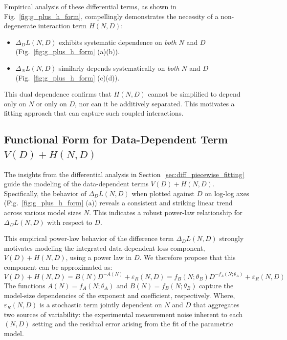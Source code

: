 \documentclass{article}
\begin{document}
Empirical analysis of these differential terms, as shown in Fig.~\ref{fig:g_plus_h_form}, compellingly demonstrates the necessity of a non-degenerate interaction term $H(N,D)$:
\begin{itemize}
    \item $\Delta_D L(N,D)$ exhibits systematic dependence on \emph{both} $N$ and $D$ (Fig.~\ref{fig:g_plus_h_form} (a)(b)).
    \item $\Delta_N L(N,D)$ similarly depends systematically on \emph{both} $N$ and $D$ (Fig.~\ref{fig:g_plus_h_form} (c)(d)).
\end{itemize}
This dual dependence confirms that $H(N,D)$ cannot be simplified to depend only on $N$ or only on $D$, nor can it be additively separated. This motivates a fitting approach that can capture such coupled interactions.

\subsection{Functional Form for Data-Dependent Term $V(D) + H(N, D)$} \label{sec:g_plus_h_form}
The insights from the differential analysis in Section~\ref{sec:diff_piecewise_fitting} guide the modeling of the data-dependent terms $V(D) + H(N,D)$. Specifically, the behavior of $\Delta_D L(N,D)$ when plotted against $D$ on log-log axes (Fig.~\ref{fig:g_plus_h_form} (a)) reveals a consistent and striking linear trend across various model sizes $N$. This indicates a robust power-law relationship for $\Delta_D L(N,D)$ with respect to $D$.

This empirical power-law behavior of the difference term $\Delta_D L(N,D)$ strongly motivates modeling the integrated data-dependent loss component, $V(D) + H(N,D)$, using a power law in $D$. We therefore propose that this component can be approximated as:
\begin{equation} \label{eq:g_plus_h_power_law_form}
    V(D) + H(N,D) = B(N) D^{-A(N)} + \varepsilon_R(N,D) = f_B(N;\theta_B) D^{-f_A(N;\theta_A)} + \varepsilon_R(N,D)
\end{equation}
The functions $A(N)=f_A(N;\theta_A)$ and $B(N)=f_B(N;\theta_B)$ capture the model-size dependencies of the exponent and coefficient, respectively. 
Where, $\varepsilon_R(N,D)$ is a stochastic term jointly dependent on $N$ and $D$ that aggregates two sources of variability: the experimental measurement noise inherent to each $(N,D)$ setting and the residual error arising from the fit of the parametric model.
\end{document}
